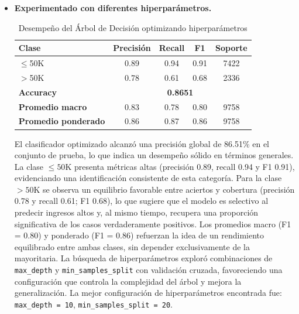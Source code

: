 \documentclass[12pt,a4paper]{article}
\begin{document}
\begin{enumerate}
    \begin{itemize}
      \item \textbf{Experimentado con diferentes hiperparámetros.}
      
      \begin{table}[H]
        \centering
        \small
          \begin{tabular}{lcccc}
          \toprule
          \textbf{Clase} & \textbf{Precisión} & \textbf{Recall} & \textbf{F1} & \textbf{Soporte} \\
          \midrule
          $\leq$50K & 0.89 & 0.94 & 0.91 & 7422 \\
          $>$50K    & 0.78 & 0.61 & 0.68 & 2336 \\
          \midrule
          \textbf{Accuracy} & \multicolumn{4}{c}{\textbf{0.8651}} \\
          \midrule
          \textbf{Promedio macro}     & 0.83 & 0.78 & 0.80 & 9758 \\
          \textbf{Promedio ponderado} & 0.86 & 0.87 & 0.86 & 9758 \\
          \bottomrule
          \end{tabular}
        \caption{Desempeño del Árbol de Decisión optimizando hiperparámetros}
        \label{tab:dt_gridsearch_test}
      \end{table}

      El clasificador optimizado alcanzó una precisión global de 86.51\% en el conjunto de prueba, 
      lo que indica un desempeño sólido en términos generales. La clase \(\leq 50\text{K}\) presenta métricas altas (precisión 0.89, recall 0.94 y F1 0.91), 
      evidenciando una identificación consistente de esta categoría. Para la clase \(>50\text{K}\) se observa un equilibrio 
      favorable entre aciertos y cobertura (precisión 0.78 y recall 0.61; F1 0.68), lo que sugiere que el modelo es selectivo al predecir ingresos altos y, 
      al mismo tiempo, recupera una proporción significativa de los casos verdaderamente positivos. Los promedios macro (F1 = 0.80) y ponderado (F1 = 0.86) 
      refuerzan la idea de un rendimiento equilibrado entre ambas clases, sin depender exclusivamente de la mayoritaria. La búsqueda de hiperparámetros exploró 
      combinaciones de \texttt{max\_depth} y \texttt{min\_samples\_split} con validación cruzada, favoreciendo una configuración que controla la complejidad del árbol 
      y mejora la generalización. La mejor configuración de hiperparámetros encontrada fue: \texttt{max\_depth = 10}, \texttt{min\_samples\_split = 20}.


\end{itemize}
\end{enumerate}
\end{document}
